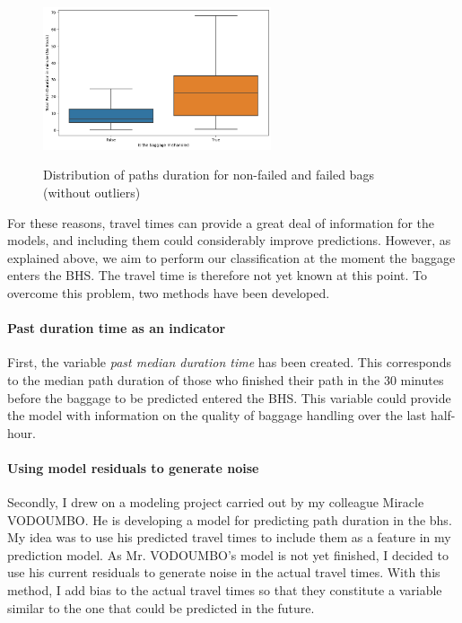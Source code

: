 \documentclass[12pt]{article}
\begin{document}
\begin{figure}[h]
    \centering
    \includegraphics[width=0.6\textwidth]{Boxplot path duration per failed status.png}\\
    \caption{Distribution of paths duration for non-failed and failed bags (without outliers)}
    \label{fig:Distribution of paths duration for non-failed and failed bags}
\end{figure}
\FloatBarrier

For these reasons, travel times can provide a great deal of information for the models, and including them could considerably improve predictions. However, as explained above, we aim to perform our classification at the moment the baggage enters the BHS. The travel time is therefore not yet known at this point. 
To overcome this problem, two methods have been developed.

\paragraph{Past duration time as an indicator} First, the variable \textit{past median duration time} has been created. This corresponds to the median path duration of those who finished their path in the 30 minutes before the baggage to be predicted entered the BHS. This variable could provide the model with information on the quality of baggage handling over the last half-hour.


\paragraph{Using model residuals to generate noise} Secondly, I drew on a modeling project carried out by my colleague Miracle VODOUMBO. He is developing a model for predicting path duration in the \acrshort{bhs}. My idea was to use his predicted travel times to include them as a feature in my prediction model. As Mr. VODOUMBO's model is not yet finished, I decided to use his current residuals to generate noise in the actual travel times. With this method, I add bias to the actual travel times so that they constitute a variable similar to the one that could be predicted in the future. \hfill \break
\end{document}
